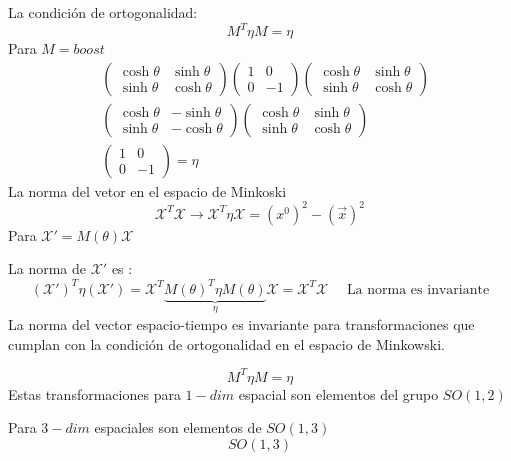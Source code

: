 \documentclass[a4paper,12pt]{article}
\begin{document}
La condición de ortogonalidad: 
\[
M^T \eta M = \eta
\]
 Para $M= boost$ 
 \begin{align*}
&\begin{pmatrix}\cosh \theta & \sinh\theta \\ \sinh\theta & \cosh \theta\end{pmatrix} \begin{pmatrix}
    1&0\\0&-1\end{pmatrix} \begin{pmatrix}
        \cosh \theta & \sinh\theta \\ \sinh \theta & \cosh \theta
    \end{pmatrix}\\
    & \begin{pmatrix} \cosh \theta & - \sinh \theta \\ \sinh\theta &-\cosh\theta    \end{pmatrix} \begin{pmatrix}
\cosh\theta & \sinh\theta \\ \sinh\theta & \cosh\theta    \end{pmatrix} \\
&\begin{pmatrix}1&0\\0&-1\end{pmatrix} = \eta
 \end{align*}
La norma del vetor en el espacio de Minkoski 
\[
\mathcal{X}^T \mathcal{X} \to \mathcal{X}^T \eta \mathcal{X} = (x^0)^2- (\Vec{x})^2
\]
Para $\mathcal{X}' = M (\theta )\mathcal{X}  $ 

La norma de $\mathcal{ X} ' $ es : 
\[
(\mathcal{ X'}  )^T \eta (\mathcal{ X'} ) = \mathcal{ X}^T \underbrace{M(\theta )^T\eta M (\theta)  }_{\eta} \mathcal{ X} = \mathcal{ X}^T \mathcal{ X} \quad \text{ La norma es invariante}
\]
La norma del vector espacio-tiempo es invariante para transformaciones que cumplan con la condición de ortogonalidad en el espacio de Minkowski. 

\[
M^T \eta M = \eta
\]
Estas transformaciones para $ 1-dim$  espacial son elementos del grupo $SO(1,2)$ 

Para $3-dim$ espaciales son elementos de $SO (1,3)$
\[
SO(1,3)
\]
\end{document}
